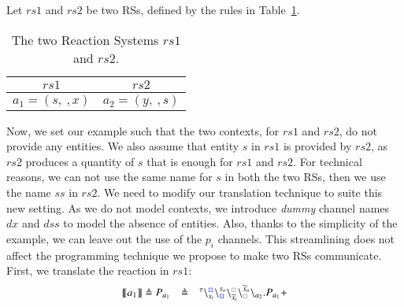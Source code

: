 \begin{example}
\label{ex:twoRS}
Let  $rs1$ and $rs2$ be two RSs, defined by the rules in Table~\ref{tab:rules}.


\begin{table}[t]
\centering
\begin{tabular}{|c|c|}
\hline
$rs1$  & $rs2$ \\
\hline
$a_1=(s,\ , x)$ & $a_2=(y,\  ,s)$\\
\hline 
\end{tabular}
\caption{The two Reaction Systems $rs1$ and $rs2$.}
\label{tab:rules}
\end{table}
 \noindent
Now, we set our example such that the two contexts, for  $rs1$ and $rs2$, do not provide any entities.
We also assume that entity $s$ in $rs1$ is provided by $rs2$, as $rs2$ produces a quantity of $s$ that is enough for $rs1$ and $rs2$.
For technical reasons, we can not use the same name for  $s$ in both the two RSs, then we use the name $ss$ in $rs2$.
%
We need to modify our translation technique to suite this new setting. 
As we do not model contexts, we introduce  \emph{dummy} channel names $dx$ and $dss$ to model the absence of entities. Also, thanks to the simplicity of the example, we can leave out the use of the   $p_i$ channels. This streamlining does not affect the programming technique we propose to make two RSs communicate.
First, we translate the reaction in $rs1$:
\[
\begin{array}{lcl}
\llbracket a_1\rrbracket \defeq P_{a_1}&\defeq &
\startchain{\silent}\chainedlink{s_i}{{\color{blue}\noact}}\chainedlink{{\color{blue}\noact}}{s_o}\chainedlink{\widetilde{x}_i}{{\color{gray}\noact}}\chainedlink{{\color{gray}\noact}}{\widetilde{x}_o}\chainend{a_2}.P_{a_1} +

\end{array}\]
\end{example}
